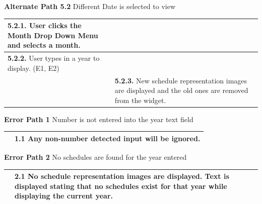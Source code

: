 \documentclass[letterpaper,12pt]{report}
\begin{document}
{\centering \textbf{Alternate Path 5.2}
\linebreak Different Date is selected to view
\begin{center}
\xuchead
\begin{tabular}{| p{8.5cm} | p{8.5cm} |}
\hline
\textbf{5.2.1.} User clicks the Month Drop Down Menu and selects a month. & \\
\hline
\textbf{5.2.2.} User types in a year to display. (E1, E2) & \\
\hline
& \textbf{5.2.3.} New schedule representation images are displayed and the old ones are removed from the widget. \\
\hline
\end{tabular}
\end{center}

\centering \textbf{Error Path 1}
\linebreak Number is not entered into the year text field
\begin{center}
\xuchead
\begin{tabular}{| p{8.5cm} | p{8.5cm} |}
\hline
& \textbf{1.1} Any non-number detected input will be ignored. \\
\hline
\end{tabular}
\end{center}

\centering \textbf{Error Path 2}
\linebreak No schedules are found for the year entered
\begin{center}
\xuchead
\begin{tabular}{| p{8.5cm} | p{8.5cm} |}
\hline
& \textbf{2.1} No schedule representation images are displayed. Text is displayed stating that no schedules exist for that year while displaying the current year. \\
\hline 
\end{tabular}
\end{center}

}

\pagebreak
\end{document}
